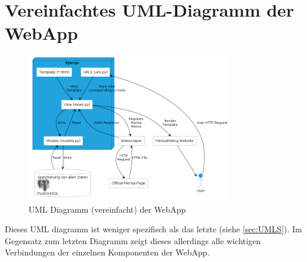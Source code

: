 \section{Vereinfachtes UML-Diagramm der WebApp} \label{sec:UMLG}
\begin{figure}[ht]
    \centering
    \includegraphics[width=0.8\textwidth]{images/UML-General.png}
    \caption{UML Diagramm (vereinfacht) der WebApp}
    \label{fig:DB}
\end{figure}

Dieses UML diagramm ist weniger spezifisch als das letzte (siehe
\ref{sec:UMLS}). Im Gegensatz zum letzten Diagramm zeigt dieses allerdings alle
wichtigen Verbindungen der einzelnen Komponenten der WebApp.


